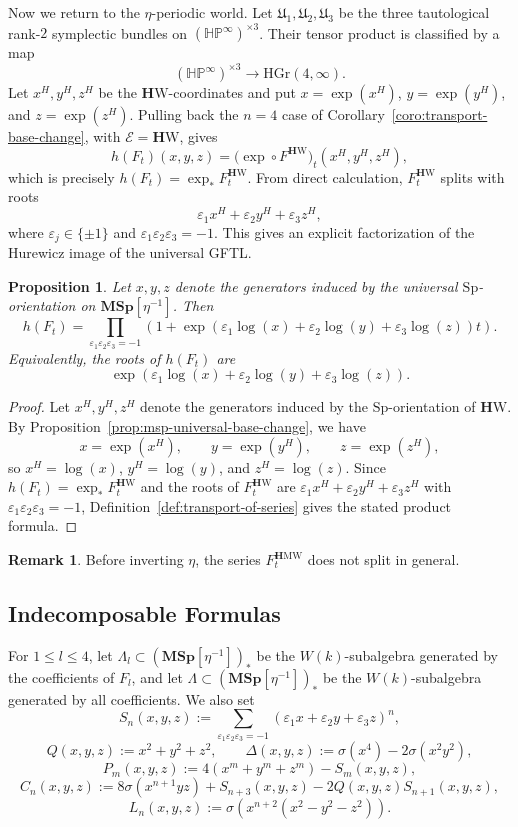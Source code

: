 \documentclass[a4paper]{amsart}
\theoremstyle{plain}
\newtheorem{proposition}[subsubsection]{Proposition}
\theoremstyle{definition}
\newtheorem{remark}[subsubsection]{Remark}
\newcommand{\Sp}{\mathrm{Sp}}
\newcommand{\MSp}{\mathbf{MSp}}
\newcommand{\etainv}{\eta^{-1}}
\newcommand{\MSpetainv}{{\MSp[\etainv]}}
\newcommand{\E}{\mathcal{E}}
\newcommand{\HP}{\mathbb{HP}}
\newcommand{\HGr}{\mathrm{HGr}}
\newcommand{\HPinf}{\HP^{\infty}}
\newcommand{\HW}{\mathbf{H}\mathrm{W}}
\newcommand{\HMW}{\mathbf{H}\mathrm{MW}}
\renewcommand{\le}{\leqslant}
\begin{document}
Now we return to the $\eta$-periodic world. Let $\mathfrak{U}_1,\mathfrak{U}_2,\mathfrak{U}_3$ be the three tautological rank-$2$ symplectic bundles on $(\HPinf)^{\times 3}$. Their tensor product is classified by a map
\[
	(\HPinf)^{\times 3}\to\HGr(4,\infty).
\]
Let $x^H,y^H,z^H$ be the $\HW$-coordinates and put $x=\exp(x^H)$, $y=\exp(y^H)$, and $z=\exp(z^H)$. Pulling back the $n=4$ case of Corollary~\ref{coro:transport-base-change}, with $\E=\HW$, gives
\[
	h(F_t)(x,y,z)=\bigl(\exp \circ F^{\HW}\bigr)_t(x^H,y^H,z^H),
\]
which is precisely $h(F_t)=\exp_*F_t^{\HW}$. From direct calculation, $F_t^{\HW}$ splits with roots
\[
	\varepsilon_1 x^H+\varepsilon_2 y^H+\varepsilon_3 z^H,
\]
where $\varepsilon_j\in\{\pm 1\}$ and $\varepsilon_1\varepsilon_2\varepsilon_3=-1$. This gives an explicit factorization of the Hurewicz image of the universal GFTL.

\begin{proposition}\label{prop:hurewicz-gftl-roots}
	Let $x,y,z$ denote the generators induced by the universal $\Sp$-orientation on $\MSpetainv$. Then
	\[
		h(F_t)=\prod_{\varepsilon_1\varepsilon_2\varepsilon_3=-1}
		\left(1+\exp \left(\varepsilon_1 \log(x) + \varepsilon_2 \log(y) + \varepsilon_3 \log(z)\right)t\right).
	\]
	Equivalently, the roots of $h(F_t)$ are
	\[
		\exp \left(\varepsilon_1 \log(x) + \varepsilon_2 \log(y) + \varepsilon_3 \log(z)\right).
	\]
\end{proposition}
\begin{proof}
	Let $x^{H},y^{H},z^{H}$ denote the generators induced by the $\Sp$-orientation of $\HW$. By Proposition~\ref{prop:msp-universal-base-change}, we have
	\[
		x=\exp(x^{H}),\qquad y=\exp(y^{H}),\qquad z=\exp(z^{H}),
	\]
	so $x^{H}=\log(x)$, $y^{H}=\log(y)$, and $z^{H}=\log(z)$. Since $h(F_t)=\exp_*F_t^{\HW}$ and the roots of $F_t^{\HW}$ are $\varepsilon_1 x^{H}+\varepsilon_2 y^{H}+\varepsilon_3 z^{H}$ with $\varepsilon_1\varepsilon_2\varepsilon_3=-1$, Definition~\ref{def:transport-of-series} gives the stated product formula.
\end{proof}
\begin{remark}
	Before inverting $\eta$, the series $F_{t}^{\HMW}$ does not split in general.
\end{remark}

\subsection{Indecomposable Formulas}\label{subsec:indecomposable-formulas}
For $1\le l\le 4$, let $\Lambda_l \subset (\MSpetainv)_*$ be the $W(k)$-subalgebra generated by the coefficients of $F_l$, and let $\Lambda \subset (\MSpetainv)_*$ be the $W(k)$-subalgebra generated by all coefficients. We also set
\[
	S_n(x,y,z) := \sum_{\varepsilon_1 \varepsilon_2 \varepsilon_3 = -1} \left(\varepsilon_1 x + \varepsilon_2 y + \varepsilon_3 z\right)^{n},
\]
\[
	Q(x,y,z):=x^2+y^2+z^2,\qquad
	\Delta(x,y,z):=\sigma(x^4)-2\sigma(x^2y^2),
\]
\[
	P_m(x,y,z):=4(x^m+y^m+z^m)-S_m(x,y,z),
\]
\[
	C_n(x,y,z):=8\sigma(x^{n+1}yz)+S_{n+3}(x,y,z)-2Q(x,y,z)S_{n+1}(x,y,z),
\]
\[
	L_n(x,y,z):=\sigma\left(x^{n+2}(x^2-y^2-z^2)\right).
\]
\end{document}
